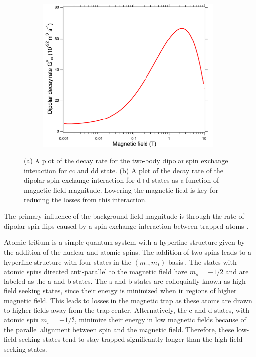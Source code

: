 \begin{figure}[htbp]
\begin{subfigure}{0.49\textwidth}
        \includegraphics*[width=\textwidth]{figs/Chapter-3/dipolarloss.pdf}
        \caption{}
    \end{subfigure}
    \caption{(a) A plot of the decay rate for the two-body dipolar spin exchange interaction for cc and dd state. (b) A plot of the decay rate of the dipolar spin exchange interaction for d+d states as a function of magnetic field magnitude. Lowering the magnetic field is key for reducing the losses from this interaction.}
    \label{fig:chap3-dipolarloss}
 \end{figure}
 The primary influence of the background field magnitude is through the rate of dipolar spin-flips caused by a spin exchange interaction between trapped atoms \cite{tritium_spin_exchange}. 
 
 Atomic tritium is a simple quantum system with a hyperfine structure given by the addition of the nuclear and atomic spins. The addition of two spins leads to a hyperfine structure with four states in the $(m_s,m_I)$ basis \cite{tritium_hyperfine}. The states with atomic spins directed anti-parallel to the magnetic field have $m_s=-1/2$ and are labeled as the a and b states. The a and b states are colloquially known as high-field seeking states, since their energy is minimized when in regions of higher magnetic field. This leads to losses in the magnetic trap as these atoms are drawn to higher fields away from the trap center. Alternatively, the c and d states, with atomic spin $m_s=+1/2$, minimize their energy in low magnetic fields because of the parallel alignment between spin and the magnetic field. Therefore, these low-field seeking states tend to stay trapped significantly longer than the high-field seeking states.

